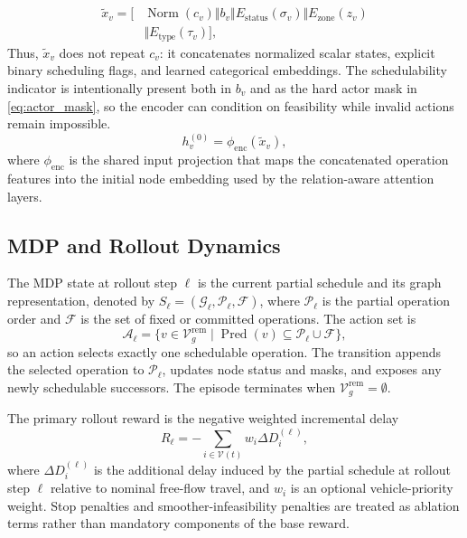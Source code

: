 \begin{addedtwoblock}
\begin{equation}
\begin{aligned}
  \tilde{x}_v = [&\operatorname{Norm}(c_v)\Vert b_v\Vert E_{\mathrm{status}}(\sigma_v)\Vert E_{\mathrm{zone}}(z_v) \\
  &\Vert E_{\mathrm{type}}(\tau_v)],
\end{aligned}
\label{eq:feature_concatenation}
\end{equation}
Thus, $\tilde{x}_v$ does not repeat $c_v$: it concatenates normalized scalar states, explicit binary scheduling flags, and learned categorical embeddings. The schedulability indicator is intentionally present both in $b_v$ and as the hard actor mask in \eqref{eq:actor_mask}, so the encoder can condition on feasibility while invalid actions remain impossible.\featureencodingpdfcomment
\begin{equation}
  h_v^{(0)}=\phi_{\mathrm{enc}}(\tilde{x}_v),
  \label{eq:input_encoder}
\end{equation}
where $\phi_{\mathrm{enc}}$ is the shared input projection that maps the concatenated operation features into the initial node embedding used by the relation-aware attention layers.
\end{addedtwoblock}
\subsection{MDP and Rollout Dynamics}
\begin{addedtwoblock}
The MDP state at rollout step $\ell$ is the current partial schedule and its graph representation, denoted by $S_\ell=(\mathcal{G}_\ell,\mathcal{P}_\ell,\mathcal{F})$, where $\mathcal{P}_\ell$ is the partial operation order and $\mathcal{F}$ is the set of fixed or committed operations. The action set is
\begin{equation}
  \mathcal{A}_\ell=\{v\in\mathcal{V}_g^{\mathrm{rem}} \mid \operatorname{Pred}(v)\subseteq \mathcal{P}_\ell\cup\mathcal{F}\},
  \label{eq:schedulable_action_set}
\end{equation}
so an action selects exactly one schedulable operation. The transition appends the selected operation to $\mathcal{P}_\ell$, updates node status and masks, and exposes any newly schedulable successors. The episode terminates when $\mathcal{V}_g^{\mathrm{rem}}=\emptyset$.

The primary rollout reward is the negative weighted incremental delay
\begin{equation}
  R_\ell = - \sum_{i\in\mathcal{V}(t)} w_i\Delta D_i^{(\ell)},
  \label{eq:delay_reward}
\end{equation}
where $\Delta D_i^{(\ell)}$ is the additional delay induced by the partial schedule at rollout step $\ell$ relative to nominal free-flow travel, and $w_i$ is an optional vehicle-priority weight. Stop penalties and smoother-infeasibility penalties are treated as ablation terms rather than mandatory components of the base reward.
\end{addedtwoblock}

